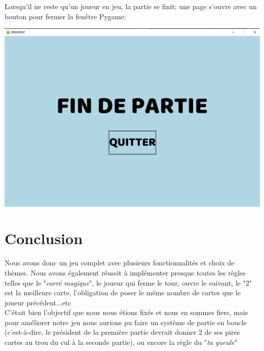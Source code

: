 \documentclass[french,12pt]{article}
\begin{document}
Lorsqu'il ne reste qu'un joueur en jeu, la partie se finit; une page s'ouvre avec un bouton pour fermer la fenêtre Pygame:

\begin{center}
	\includegraphics[scale=0.3]{img/fin_game.png}
\end{center}

\section{Conclusion}

Nous avons donc un jeu complet avec plusieurs fonctionnalités et choix de thèmes. Nous avons également réussit à implémenter presque toutes les règles telles que le "\textit{carré magique}", le joueur qui ferme le tour, ouvre le suivant, le "2" est la meilleure carte, l'obligation de poser le même nombre de cartes que le joueur précédent...etc\\
C'était bien l'objectif que nous nous étions fixés et nous en sommes fiers, mais pour améliorer notre jeu nous aurions pu faire un système de partie en boucle (c'est-à-dire, le président de la première partie devrait donner 2 de ses pires cartes au trou du cul à la seconde partie), ou encore la règle du "\textit{ta gueule}"
\end{document}
